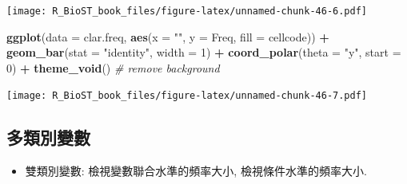 \documentclass[
]{book}
\newenvironment{Shaded}{\begin{snugshade}}{\end{snugshade}}
\newcommand{\CommentTok}[1]{\textcolor[rgb]{0.56,0.35,0.01}{\textit{#1}}}
\newcommand{\DataTypeTok}[1]{\textcolor[rgb]{0.13,0.29,0.53}{#1}}
\newcommand{\DecValTok}[1]{\textcolor[rgb]{0.00,0.00,0.81}{#1}}
\newcommand{\KeywordTok}[1]{\textcolor[rgb]{0.13,0.29,0.53}{\textbf{#1}}}
\newcommand{\NormalTok}[1]{#1}
\newcommand{\OperatorTok}[1]{\textcolor[rgb]{0.81,0.36,0.00}{\textbf{#1}}}
\newcommand{\StringTok}[1]{\textcolor[rgb]{0.31,0.60,0.02}{#1}}
\providecommand{\tightlist}{%
  \setlength{\itemsep}{0pt}\setlength{\parskip}{0pt}}
\begin{document}
\texttt{[image: R\_BioST\_book\_files/figure-latex/unnamed-chunk-46-6.pdf]}

\begin{Shaded}
\begin{Highlighting}[]
\KeywordTok{ggplot}\NormalTok{(}\DataTypeTok{data =}\NormalTok{ clar.freq, }\KeywordTok{aes}\NormalTok{(}\DataTypeTok{x =} \StringTok{""}\NormalTok{, }\DataTypeTok{y =}\NormalTok{ Freq, }\DataTypeTok{fill =}\NormalTok{ cellcode)) }\OperatorTok{+}
\StringTok{  }\KeywordTok{geom\_bar}\NormalTok{(}\DataTypeTok{stat =} \StringTok{"identity"}\NormalTok{, }\DataTypeTok{width =} \DecValTok{1}\NormalTok{) }\OperatorTok{+}
\StringTok{  }\KeywordTok{coord\_polar}\NormalTok{(}\DataTypeTok{theta =} \StringTok{"y"}\NormalTok{, }\DataTypeTok{start =} \DecValTok{0}\NormalTok{) }\OperatorTok{+}
\StringTok{  }\KeywordTok{theme\_void}\NormalTok{() }\CommentTok{\# remove background}
\end{Highlighting}
\end{Shaded}

\texttt{[image: R\_BioST\_book\_files/figure-latex/unnamed-chunk-46-7.pdf]}

\hypertarget{ux591aux985eux5225ux8b8aux6578}{%
\subsection{多類別變數}\label{ux591aux985eux5225ux8b8aux6578}}

\begin{itemize}
\tightlist
\item
  雙類別變數: 檢視變數聯合水準的頻率大小,
  檢視條件水準的頻率大小.
\end{itemize}
\end{document}
